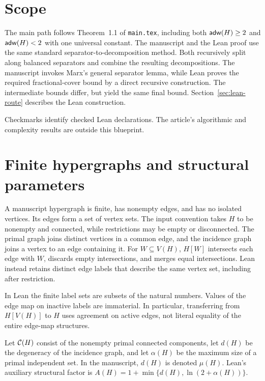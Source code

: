 \section{Scope}

The main path follows Theorem~1.1 of \texttt{main.tex}, including both
$\mathsf{adw}(H)\ge2$ and $\mathsf{adw}(H)<2$ with one universal constant.
The manuscript and the Lean proof use the same standard
separator-to-decomposition method. Both recursively split along balanced
separators and combine the resulting decompositions. The manuscript invokes
Marx's general separator lemma, while Lean proves the required fractional-cover
bound by a direct recursive construction. The intermediate bounds differ,
but yield the same final bound. Section~\ref{sec:lean-route} describes the
Lean construction.

Checkmarks identify checked Lean declarations. The article's algorithmic and
complexity results are outside this blueprint.

\printbreak
\section{Finite hypergraphs and structural parameters}

\begin{definition}[Hypergraphs]
\label{def:hypergraph}
A manuscript hypergraph is finite, has nonempty edges, and has no isolated
vertices. Its edges form a set of vertex sets. The input convention takes $H$
to be nonempty and connected, while restrictions may be empty or disconnected.
The primal graph joins distinct vertices in a common edge, and the incidence
graph joins a vertex to an edge containing it. For $W\subseteq V(H)$,
$H[W]$ intersects each edge with $W$, discards empty intersections, and merges
equal intersections. Lean instead retains distinct edge labels that describe
the same vertex set, including after restriction.
\end{definition}

In Lean the finite label sets are subsets of the natural numbers. Values of
the edge map on inactive labels are immaterial. In particular, transferring
from $H[V(H)]$ to $H$ uses agreement on active edges, not literal equality
of the entire edge-map structures.

\begin{definition}
\label{def:structure}
\leanok
Let $\mathcal C(H)$ consist of the nonempty primal connected components, let $d(H)$
be the degeneracy of the incidence graph, and let $\alpha(H)$ be the maximum
size of a primal independent set. In the manuscript, $d(H)$ is denoted
$\mu(H)$. Lean's auxiliary structural factor is
$A(H)=1+\min\{d(H),\ln(2+\alpha(H))\}$.
\end{definition}

